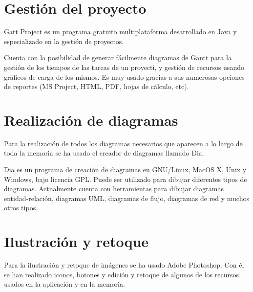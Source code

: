 \section{Gestión del proyecto}

Gatt Project es un programa gratuito multiplataforma desarrollado en Java y especializado en la gestión de proyectos.


Cuenta con la posibilidad de generar fácilmente diagramas de Gantt para la gestión de los tiempos de las tareas de un proyecti, y gestión de recursos usando gráficos de carga de los mismos. Es muy usado gracias a sus numerosas opciones de reportes (MS Project, HTML, PDF, hojas de cálculo, etc).

\section{Realización de diagramas}

Para la realización de todos los diagramas necesarios que aparecen a lo largo de toda la memoria se ha usado el creador de diagramas llamado Dia.\\


Dia es un programa de creación de diagramas en GNU/Linux, MacOS X, Unix y Windows, bajo licencia GPL. Puede ser utilizado para dibujar diferentes tipos de diagramas. Actualmente cuenta con herramientas para dibujar diagramas entidad-relación, diagramas UML, diagramas de flujo, diagramas de red y muchos otros tipos.

\section{Ilustración y retoque}

Para la ilustración y retoque de imágenes se ha usado Adobe Photoshop. Con él se han realizado iconos, botones y edición y retoque de algunos de los recursos usados en la aplicación y en la memoria.

